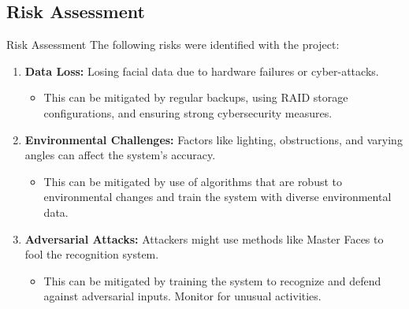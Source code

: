 \subsection{Risk Assessment}
\begin{frame}{Risk Assessment}
	The following risks were identified with the project:
	\begin{enumerate}
		\item \textbf{Data Loss:} Losing facial data due to hardware failures or cyber-attacks. 
		\begin{itemize}
			\item This can be mitigated by regular backups, using RAID storage configurations, and ensuring strong cybersecurity measures.
		\end{itemize}

		\item \textbf{Environmental Challenges:} Factors like lighting, obstructions, and varying angles can affect the system's accuracy.
		\begin{itemize}
			\item This can be mitigated by use of algorithms that are robust to environmental changes and train the system with diverse environmental data.
		\end{itemize}

		\item \textbf{Adversarial Attacks:} Attackers might use methods like Master Faces to fool the recognition system.
		\begin{itemize}
			\item This can be mitigated by training the system to recognize and defend against adversarial inputs. Monitor for unusual activities.

		\end{itemize}
		
	\end{enumerate}
\end{frame}
